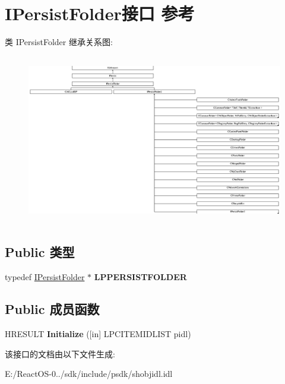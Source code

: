 \hypertarget{interface_i_persist_folder}{}\section{I\+Persist\+Folder接口 参考}
\label{interface_i_persist_folder}
类 I\+Persist\+Folder 继承关系图\+:\begin{figure}[H]
\begin{center}
\leavevmode
\includegraphics[height=7.450980cm]{interface_i_persist_folder}
\end{center}
\end{figure}
\subsection*{Public 类型}
\begin{DoxyCompactItemize}
\item 
\mbox{\label{interface_i_persist_folder_a785ed23ddc70be91caa8644770a6fd0b}} 
typedef \hyperlink{interface_i_persist_folder}{I\+Persist\+Folder} $\ast$ {\bfseries L\+P\+P\+E\+R\+S\+I\+S\+T\+F\+O\+L\+D\+ER}
\end{DoxyCompactItemize}
\subsection*{Public 成员函数}
\begin{DoxyCompactItemize}
\item 
\mbox{\label{interface_i_persist_folder_a8de5b14bf2c03939db6d554292fd1b2c}} 
H\+R\+E\+S\+U\+LT {\bfseries Initialize} (\mbox{[}in\mbox{]} L\+P\+C\+I\+T\+E\+M\+I\+D\+L\+I\+ST pidl)
\end{DoxyCompactItemize}


该接口的文档由以下文件生成\+:\begin{DoxyCompactItemize}
\item 
E\+:/\+React\+O\+S-\/0../sdk/include/psdk/shobjidl.\+idl\end{DoxyCompactItemize}
